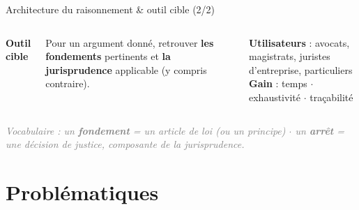 \documentclass[aspectratio=169,10pt]{beamer}
\newcommand{\keybox}[1]{%
  \begin{center}
  \colorbox{accentsoft}{\parbox{0.9\linewidth}{\centering #1}}
  \end{center}}
\begin{document}
\begin{frame}{Architecture du raisonnement \& outil cible (2/2)}
\begin{columns}[T]
    \vspace{0.3em}
    \textbf{Outil cible}
    \keybox{\small Pour un argument donné, retrouver \textbf{les fondements} pertinents et \textbf{la jurisprudence} applicable (y compris contraire).}

    \textbf{Utilisateurs} : avocats, magistrats, juristes d'entreprise, particuliers\\
    \textbf{Gain} : temps $\cdot$ exhaustivité $\cdot$ traçabilité
  \end{columns}
  \vspace{1em}                                                                                        
  \footnotesize\textcolor{gray}{\textit{Vocabulaire : un \textbf{fondement} = un article de loi (ou un principe) $\cdot$ un \textbf{arrêt} = une décision de justice, composante de la jurisprudence.}}
\end{frame}

\section{Problématiques}
\end{document}
